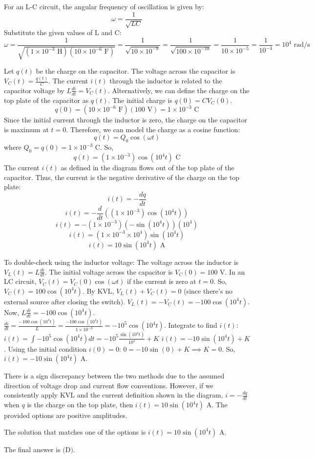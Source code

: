 \documentclass[a4paper,12pt]{article}
\begin{document}
For an L-C circuit, the angular frequency of oscillation is given by:
$$\omega = \frac{1}{\sqrt{LC}}$$
Substitute the given values of L and C:
$$\omega = \frac{1}{\sqrt{(1 \times 10^{-3} \text{ H})(10 \times 10^{-6} \text{ F})}} = \frac{1}{\sqrt{10 \times 10^{-9}}} = \frac{1}{\sqrt{100 \times 10^{-10}}} = \frac{1}{10 \times 10^{-5}} = \frac{1}{10^{-4}} = 10^4 \text{ rad/s}$$

Let $q(t)$ be the charge on the capacitor. The voltage across the capacitor is $V_C(t) = \frac{q(t)}{C}$.
The current $i(t)$ through the inductor is related to the capacitor voltage by $L \frac{di}{dt} = V_C(t)$.
Alternatively, we can define the charge on the top plate of the capacitor as $q(t)$. The initial charge is $q(0) = C V_C(0)$.
$$q(0) = (10 \times 10^{-6} \text{ F})(100 \text{ V}) = 1 \times 10^{-3} \text{ C}$$
Since the initial current through the inductor is zero, the charge on the capacitor is maximum at $t=0$. Therefore, we can model the charge as a cosine function:
$$q(t) = Q_0 \cos(\omega t)$$
where $Q_0 = q(0) = 1 \times 10^{-3} \text{ C}$.
So,
$$q(t) = (1 \times 10^{-3}) \cos(10^4 t) \text{ C}$$
The current $i(t)$ as defined in the diagram flows out of the top plate of the capacitor. Thus, the current is the negative derivative of the charge on the top plate:
$$i(t) = -\frac{dq}{dt}$$
$$i(t) = -\frac{d}{dt} \left( (1 \times 10^{-3}) \cos(10^4 t) \right)$$
$$i(t) = -(1 \times 10^{-3}) (-\sin(10^4 t)) (10^4)$$
$$i(t) = (1 \times 10^{-3} \times 10^4) \sin(10^4 t)$$
$$i(t) = 10 \sin(10^4 t) \text{ A}$$

To double-check using the inductor voltage:
The voltage across the inductor is $V_L(t) = L \frac{di}{dt}$.
The initial voltage across the capacitor is $V_C(0) = 100 \text{ V}$.
In an LC circuit, $V_C(t) = V_C(0) \cos(\omega t)$ if the current is zero at $t=0$.
So, $V_C(t) = 100 \cos(10^4 t)$.
By KVL, $V_L(t) + V_C(t) = 0$ (since there's no external source after closing the switch).
$V_L(t) = -V_C(t) = -100 \cos(10^4 t)$.
Now, $L \frac{di}{dt} = -100 \cos(10^4 t)$.
$\frac{di}{dt} = \frac{-100 \cos(10^4 t)}{L} = \frac{-100 \cos(10^4 t)}{1 \times 10^{-3}} = -10^5 \cos(10^4 t)$.
Integrate to find $i(t)$:
$i(t) = \int -10^5 \cos(10^4 t) dt = -10^5 \frac{\sin(10^4 t)}{10^4} + K$
$i(t) = -10 \sin(10^4 t) + K$.
Using the initial condition $i(0) = 0$:
$0 = -10 \sin(0) + K \implies K = 0$.
So, $i(t) = -10 \sin(10^4 t) \text{ A}$.

There is a sign discrepancy between the two methods due to the assumed direction of voltage drop and current flow conventions. However, if we consistently apply KVL and the current definition shown in the diagram, $i = -\frac{dq}{dt}$ when $q$ is the charge on the top plate, then $i(t) = 10 \sin(10^4 t) \text{ A}$. The provided options are positive amplitudes.

The solution that matches one of the options is $i(t) = 10 \sin(10^4 t) \text{ A}$.

The final answer is $\boxed{\text{(D)}}$.
\end{document}
